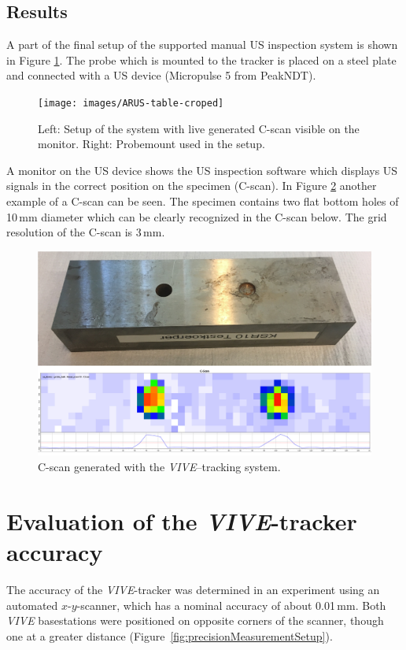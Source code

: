 \documentclass{VRARWorkshop}
\begin{document}
\subsection{Results}
A part of the final setup of the supported manual US inspection system is shown in Figure \ref{fig:AR-table}.
The probe which is mounted to the tracker is placed on a steel plate and connected with a US device (Micropulse 5 from PeakNDT).
\begin{figure}[h!]
    \begin{center}
        \texttt{[image: images/ARUS-table-croped]}
        \caption{\label{fig:AR-table} Left: Setup of the system with live generated C-scan visible on the monitor. Right: Probemount used in the setup.}
    \end{center}
\end{figure}
A monitor on the US device shows the US inspection software which displays US signals in the correct position on the specimen (C-scan).
In Figure \ref{fig:resultCScan} another example of a C-scan can be seen.
The specimen contains two flat bottom holes of 10\,mm diameter which can be clearly recognized in the C-scan below.
The grid resolution of the C-scan is 3\,mm.
\begin{figure}[h!]
    \begin{center}
        \includegraphics[width=120mm]{images/CScanARUS}
        \caption{\label{fig:resultCScan} C-scan generated with the \textit{VIVE}--tracking system.}
    \end{center}
\end{figure}

\section{Evaluation of the \textit{VIVE}-tracker accuracy}
The accuracy of the \textit{VIVE}-tracker was determined in an experiment using an automated $x$-$y$-scanner, which has a nominal accuracy of about 0.01\,mm.
Both \textit{VIVE} basestations were positioned on opposite corners of the scanner, though one at a greater distance (Figure~\ref{fig:precisionMeasurementSetup}).
\end{document}
